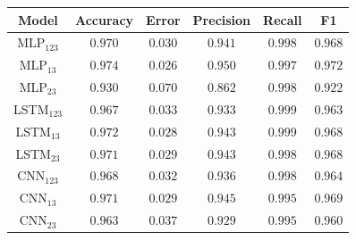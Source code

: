 \documentclass[a4paper,fleqn]{cas-sc}
\begin{document}
\hfill
\begin{minipage}{0.45\textwidth}
	\vspace{0.5cm}
	\begingroup
	\begin{tiny}	
		\setlength{\tabcolsep}{3pt}
		\renewcommand{\arraystretch}{1.15}
		
		
		\begin{tabular*}{\textwidth}{@{} CCCCCC@{} }
			\toprule
			Model&Accuracy&Error&Precision&Recall&F1 \\
			\midrule
				MLP$_{123}$ & $0.970$ & $0.030$ & $0.941$ & $0.998$ & $0.968$ \\
				MLP$_{13}$ & $0.974$ & $0.026$ & $0.950$ & $0.997$ & $0.972$ \\
				MLP$_{23}$ & $0.930$ & $0.070$ & $0.862$ & $0.998$ & $0.922$ \\
				LSTM$_{123}$ & $0.967$ & $0.033$ & $0.933$ & $0.999$ & $0.963$ \\
				LSTM$_{13}$ & $0.972$ & $0.028$ & $0.943$ & $0.999$ & $0.968$ \\
				LSTM$_{23}$ & $0.971$ & $0.029$ & $0.943$ & $0.998$ & $0.968$ \\
				CNN$_{123}$ & $0.968$ & $0.032$ & $0.936$ & $0.998$ & $0.964$ \\
				CNN$_{13}$ & $0.971$ & $0.029$ & $0.945$ & $0.995$ & $0.969$ \\
				CNN$_{23}$ & $0.963$ & $0.037$ & $0.929$ & $0.995$ & $0.960$ \\    		
			\bottomrule
		\end{tabular*}
		\vspace{-0.3cm}
		\label{tab:metricas_generalizacao_500Mbps_teste}
	\end{tiny}
	\endgroup
\end{minipage}
\hfill
\end{document}
